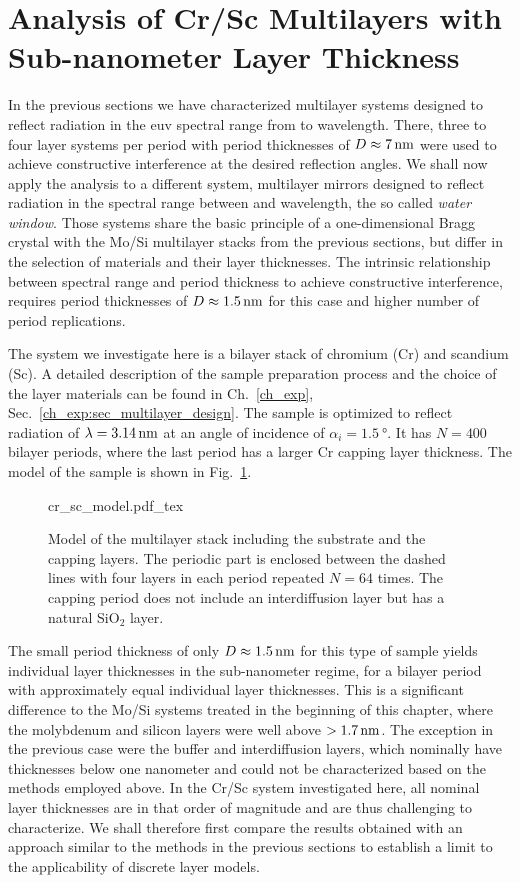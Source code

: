 \section{Analysis of Cr/Sc Multilayers with Sub-nanometer Layer Thickness} \label{ch_spec:sec_CrSc}
In the previous sections we have characterized multilayer systems designed to reflect radiation in the \gls{euv} spectral range from  to  wavelength. There, three to four layer systems per period with period thicknesses of $D\approx\nm{7}$ were used to achieve constructive interference at the desired reflection angles. We shall now apply the analysis to a different system, multilayer mirrors designed to reflect radiation in the spectral range between  and  wavelength, the so called \emph{water window}. Those systems share the basic principle of a one-dimensional Bragg crystal with the Mo/Si multilayer stacks from the previous sections, but differ in the selection of materials and their layer thicknesses. The intrinsic relationship between spectral range and period thickness to achieve constructive interference, requires period thicknesses of $D\approx \nm{1.5}$ for this case and higher number of period replications.


The system we investigate here is a bilayer stack of chromium (Cr) and scandium (Sc). A detailed description of the sample preparation process and the choice of the layer materials can be found in Ch.~\ref{ch_exp}, Sec.~\ref{ch_exp:sec_multilayer_design}. The sample is optimized to reflect radiation of $\lambda = \nm{3.14}$ at an angle of incidence of $\alpha_i = \SI{1.5}{\degree}$. It has $N=400$ bilayer periods, where the last period has a larger Cr capping layer thickness. The model of the sample is shown in Fig.~\ref{ch_spec:fig_Cr_Sc_model}.
\begin{figure}[htbp]
    \def\svgwidth{0.7\textwidth}
    \selectfont\footnotesize
    {cr_sc_model.pdf_tex}
    \caption{Model of the multilayer stack including the substrate and the capping layers. The periodic part is enclosed between the dashed lines with four layers in each period repeated $N=64$ times. The capping period does not include an interdiffusion layer but has a natural SiO$_2$ layer.}
    \label{ch_spec:fig_Cr_Sc_model}
\end{figure}
The small period thickness of only $D\approx\nm{1.5}$ for this type of sample yields individual layer thicknesses in the sub-nanometer regime, for a bilayer period with approximately equal individual layer thicknesses. This is a significant difference to the Mo/Si systems treated in the beginning of this chapter, where the molybdenum and silicon layers were well above $>\nm{1.7}$. The exception in the previous case were the buffer and interdiffusion layers, which nominally have thicknesses below one nanometer and could not be characterized based on the methods employed above. In the Cr/Sc system investigated here, all nominal layer thicknesses are in that order of magnitude and are thus challenging to characterize. We shall therefore first compare the results obtained with an approach similar to the methods in the previous sections to establish a limit to the applicability of discrete layer models.


